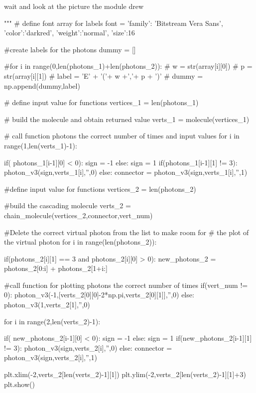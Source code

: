 \documentclass[11pt,a4paper,notitlepage]{article}
\begin{document}
\begin{code}
        wait and look at the picture the module drew

    """
    # define font array for labels
    font = {'family': 'Bitstream Vera Sans',
            'color':'darkred',
            'weight':'normal',
            'size':16}
    
    #create labels for the photons
    dummy = [] 
      
    #for i in range(0,len(photons_1)+len(photons_2)):
    #    w = str(array[i][0]) 
    #    p = str(array[i][1]) 
    #    label = 'E' + '('+ w +','+ p + ')'
    #    dummy = np.append(dummy,label)
    
    # define input value for functions
    vertices_1 = len(photons_1)
    
    # build the molecule and obtain returned value
    verts_1 = molecule(vertices_1)
    
    # call function photons the correct number of times and input values
    for i in range(1,len(verts_1)-1):
        
        if( photons_1[i-1][0] < 0):
            sign = -1
        else:
            sign = 1
        if(photons_1[i-1][1] != 3):
            photon_v3(sign,verts_1[i],'',0)  
        else:
            connector = photon_v3(sign,verts_1[i],'',1)
    
    #define input value for functions   
    vertices_2 = len(photons_2)
    
    #build the cascading molecule
    verts_2 = chain_molecule(vertices_2,connector,vert_num) 
    
    #Delete the correct virtual photon from the list to make room for 
    #  the plot of the virtual photon
    for i in range(len(photons_2)):
        
        if(photons_2[i][1] == 3 and photons_2[i][0] > 0):
            new_photons_2 = photons_2[0:i] + photons_2[1+i:]
            
    #call function for plotting photons the correct number of times
    if(vert_num != 0):
        photon_v3(-1,[verts_2[0][0]-2*np.pi,verts_2[0][1]],'',0)
    else:
        photon_v3(1,verts_2[1],'',0)
    
    for i in range(2,len(verts_2)-1):
        
        if( new_photons_2[i-1][0] < 0):
            sign = -1
        else:
            sign = 1
        if(new_photons_2[i-1][1] != 3):
            photon_v3(sign,verts_2[i],'',0)  
        else:
            connector = photon_v3(sign,verts_2[i],'',1)     
    
    plt.xlim(-2,verts_2[len(verts_2)-1][1])
    plt.ylim(-2,verts_2[len(verts_2)-1][1]+3)   
    plt.show()\end{code}
\end{document}
